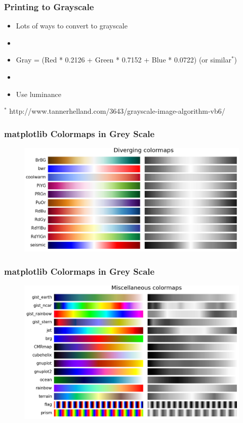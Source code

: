 \documentclass[ignorenonframetext]{beamer}
\begin{document}
\begin{frame}[t]\frametitle{Printing to Grayscale}
    \begin{itemize}
        \item {\Large Lots of ways to convert to grayscale}
        \item[]
        \item {\Large Gray = (Red * 0.2126 + Green * 0.7152 + Blue * 0.0722) (or similar$^*$)}
        \item[]
        \item {\Large Use luminance}
    \end{itemize}
    {\tiny $^*$ http://www.tannerhelland.com/3643/grayscale-image-algorithm-vb6/}
\end{frame}

\begin{frame}[t]\frametitle{matplotlib Colormaps in Grey Scale}
    \begin{figure}[htbp]
        \centering
        \includegraphics[width=\textwidth]{figures/bwDiverging}
    \end{figure}
\end{frame}
\begin{frame}[t,noframenumbering]\frametitle{matplotlib Colormaps in Grey Scale}
    \begin{figure}[htbp]
        \centering
        \includegraphics[width=\textwidth]{figures/bwMiscellaneous}
    \end{figure}
\end{frame}
\end{document}
